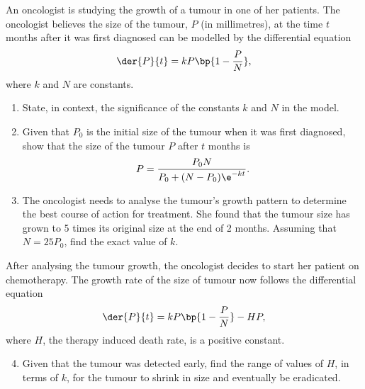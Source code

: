 \clearpage
\begin{problem}
    An oncologist is studying the growth of a tumour in one of her patients. The oncologist believes the size of the tumour, $P$ (in millimetres), at the time $t$ months after it was first diagnosed can be modelled by the differential equation \[\der{P}{t} = kP \bp{1 - \frac{P}{N}},\] where $k$ and $N$ are constants.

    \begin{enumerate}
        \item State, in context, the significance of the constants $k$ and $N$ in the model.
        \item Given that $P_0$ is the initial size of the tumour when it was first diagnosed, show that the size of the tumour $P$ after $t$ months is \[P = \frac{P_0 N}{P_0 + (N - P_0) \e^{-kt}}.\]
        \item The oncologist needs to analyse the tumour's growth pattern to determine the best course of action for treatment. She found that the tumour size has grown to 5 times its original size at the end of 2 months. Assuming that $N = 25 P_0$, find the exact value of $k$.
    \end{enumerate}

    After analysing the tumour growth, the oncologist decides to start her patient on chemotherapy. The growth rate of the size of tumour now follows the differential equation \[\der{P}{t} = kP \bp{1 - \frac{P}{N}} - HP,\] where $H$, the therapy induced death rate, is a positive constant.

    \begin{enumerate}
        \setcounter{enumi}{3}
        \item Given that the tumour was detected early, find the range of values of $H$, in terms of $k$, for the tumour to shrink in size and eventually be eradicated.
    \end{enumerate}
\end{problem}
